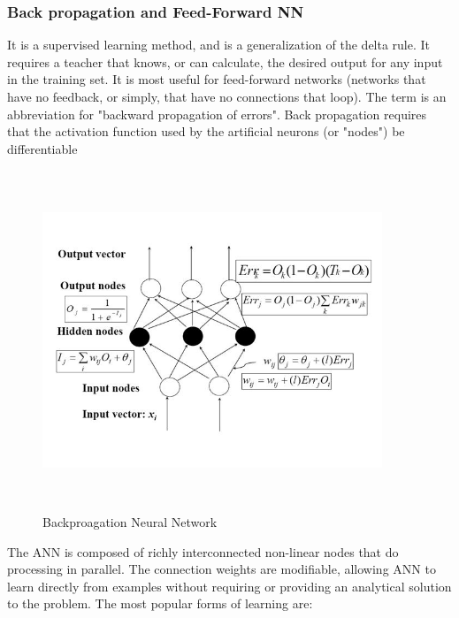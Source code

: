 \documentclass[a4paper,14pt,onecolumn]{article}
\begin{document}
  \subsubsection{Back propagation and Feed-Forward NN}
         It is a supervised learning method, and is a generalization of the delta rule. It requires a teacher that knows, or can calculate, the desired output for any input in the training set. It is most useful for feed-forward networks (networks that have no feedback, or simply, that have no connections that loop). The term is an abbreviation for "backward propagation of errors". Back propagation requires that the activation function used by the artificial neurons (or "nodes") be differentiable

\begin{figure}[hbp]
\begin{center}
\includegraphics[height=4in,width=4in]
{BBNeuralnetwork.jpg}  
\caption{Backproagation Neural Network}
\end{center}
\end{figure} 

The ANN is composed of richly interconnected non-linear nodes that do processing in parallel. The connection weights are modifiable, allowing ANN to learn directly from examples without requiring or providing an analytical solution to the problem. The most popular forms of learning are:
\end{document}
